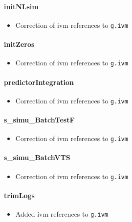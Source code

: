 \documentclass[12pt]{article}
\begin{document}
\paragraph{initNLsim}
	\begin{itemize}
		\item Correction of ivm references to \verb|g.ivm|
	\end{itemize}
\paragraph{initZeros}
	\begin{itemize}
		\item Correction of ivm references to \verb|g.ivm|
	\end{itemize}

\paragraph{predictorIntegration}
	\begin{itemize}
		\item Correction of ivm references to \verb|g.ivm|
	\end{itemize}
	
\paragraph{s\_simu\_BatchTestF}
	\begin{itemize}
		\item Correction of ivm references to \verb|g.ivm|
	\end{itemize}
	
\paragraph{s\_simu\_BatchVTS}
	\begin{itemize}
		\item Correction of ivm references to \verb|g.ivm|
	\end{itemize}
	
\paragraph{trimLogs}
	\begin{itemize}
		\item Added ivm references to \verb|g.ivm|
	\end{itemize}
\end{document}
